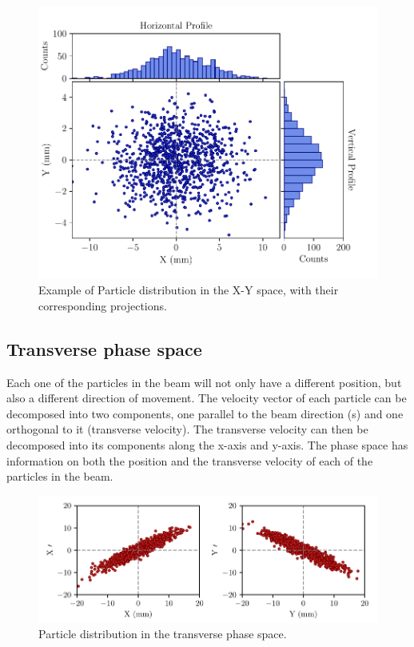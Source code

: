 \begin{figure}[t]
    \centering
    \includegraphics[width=0.9\columnwidth]{Figure_ParticlePositionExample/ParticlePosition.pdf}
    \caption{Example of Particle distribution in the X-Y space, with their corresponding projections.}
    \label{fig:TransversePlane}
\end{figure}

\subsection{Transverse phase space}
\label{subsec:TransPhSp}

Each one of the particles in the beam will not only have a different position, but also a different direction of movement. The velocity vector of each particle can be decomposed into two components, one parallel to the beam direction (s) and one orthogonal to it (transverse velocity). The transverse velocity can then be decomposed into its components along the x-axis and y-axis. The phase space has information on both the position and the transverse velocity of each of the particles in the beam. 

\begin{figure}[h!]
    \centering
    \includegraphics[width=1.0\columnwidth]{Figure_PhaseSpaceDist/PhaseSpaceDist.pdf}
    \caption{Particle distribution in the transverse phase space. }
    \label{fig:PhaseSpace}
\end{figure}

